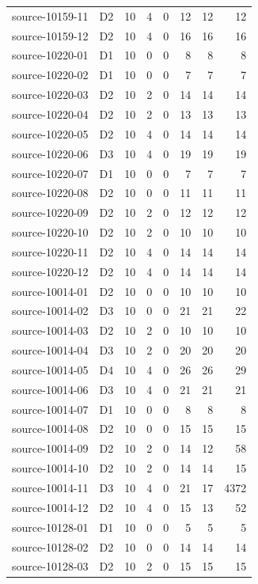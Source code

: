 \begin{longtable}{llrrrrrr}
source-10159-11 & D2 & 10 & 4 & 0 & 12 & 12 & 12\\
source-10159-12 & D2 & 10 & 4 & 0 & 16 & 16 & 16\\
source-10220-01 & D1 & 10 & 0 & 0 & 8 & 8 & 8\\
source-10220-02 & D1 & 10 & 0 & 0 & 7 & 7 & 7\\
source-10220-03 & D2 & 10 & 2 & 0 & 14 & 14 & 14\\
source-10220-04 & D2 & 10 & 2 & 0 & 13 & 13 & 13\\
source-10220-05 & D2 & 10 & 4 & 0 & 14 & 14 & 14\\
source-10220-06 & D3 & 10 & 4 & 0 & 19 & 19 & 19\\
source-10220-07 & D1 & 10 & 0 & 0 & 7 & 7 & 7\\
source-10220-08 & D2 & 10 & 0 & 0 & 11 & 11 & 11\\
source-10220-09 & D2 & 10 & 2 & 0 & 12 & 12 & 12\\
source-10220-10 & D2 & 10 & 2 & 0 & 10 & 10 & 10\\
source-10220-11 & D2 & 10 & 4 & 0 & 14 & 14 & 14\\
source-10220-12 & D2 & 10 & 4 & 0 & 14 & 14 & 14\\
source-10014-01 & D2 & 10 & 0 & 0 & 10 & 10 & 10\\
source-10014-02 & D3 & 10 & 0 & 0 & 21 & 21 & 22\\
source-10014-03 & D2 & 10 & 2 & 0 & 10 & 10 & 10\\
source-10014-04 & D3 & 10 & 2 & 0 & 20 & 20 & 20\\
source-10014-05 & D4 & 10 & 4 & 0 & 26 & 26 & 29\\
source-10014-06 & D3 & 10 & 4 & 0 & 21 & 21 & 21\\
source-10014-07 & D1 & 10 & 0 & 0 & 8 & 8 & 8\\
source-10014-08 & D2 & 10 & 0 & 0 & 15 & 15 & 15\\
source-10014-09 & D2 & 10 & 2 & 0 & 14 & 12 & 58\\
source-10014-10 & D2 & 10 & 2 & 0 & 14 & 14 & 15\\
source-10014-11 & D3 & 10 & 4 & 0 & 21 & 17 & 4372\\
source-10014-12 & D2 & 10 & 4 & 0 & 15 & 13 & 52\\
source-10128-01 & D1 & 10 & 0 & 0 & 5 & 5 & 5\\
source-10128-02 & D2 & 10 & 0 & 0 & 14 & 14 & 14\\
source-10128-03 & D2 & 10 & 2 & 0 & 15 & 15 & 15\\

\end{longtable}
